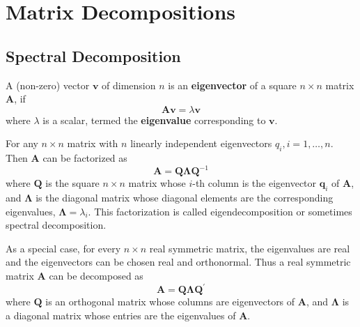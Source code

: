 \chapter{Matrix Decompositions}
\label{chapter:matrix-decompositions}

\section{Spectral Decomposition}

\begin{definition}
	A (non-zero) vector $\mathbf{v}$ of dimension $n$ is an \textbf{eigenvector} of a square $n\times n$ matrix $\mathbf{A}$, if
	\begin{equation}
		\mathbf{A}\mathbf{v}=\lambda\mathbf{v}
	\end{equation}
	where $\lambda$ is a scalar, termed the \textbf{eigenvalue} corresponding to $\mathbf{v}$.
\end{definition}

\begin{definition}
	For any $n\times n$ matrix with $n$ linearly independent eigenvectors $q_{i},i=1,\ldots,n$. Then $\mathbf{A}$ can be factorized as
	\begin{equation*}
		\mathbf{A}=\mathbf{Q}\boldsymbol{\Lambda}\mathbf{Q}^{-1}
	\end{equation*}
	where $\mathbf{Q}$ is the square $n\times n$ matrix whose $i$-th column is the eigenvector $\mathbf{q}_{i}$ of $\mathbf{A}$, and $\boldsymbol{\Lambda}$ is the diagonal matrix whose diagonal elements are the corresponding eigenvalues, $\boldsymbol{\Lambda}=\lambda_{i}$. This factorization is called eigendecomposition or sometimes spectral decomposition.
\end{definition}

\begin{example}
	As a special case, for every $n\times n$ real symmetric matrix, the eigenvalues are real and the eigenvectors can be chosen real and orthonormal. Thus a real symmetric matrix $\mathbf{A}$ can be decomposed as
	\begin{equation}
		\mathbf{A}=\mathbf{Q}\boldsymbol{\Lambda}\mathbf{Q}^{\prime}
	\end{equation}
	where $\mathbf{Q}$ is an orthogonal matrix whose columns are  eigenvectors of $\mathbf{A}$, and $\boldsymbol{\Lambda}$ is a diagonal matrix whose entries are the eigenvalues of $\mathbf{A}$.
\end{example}

